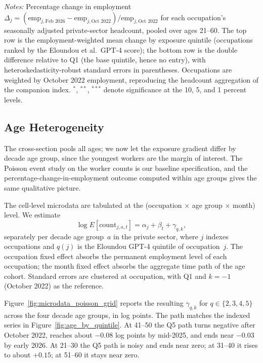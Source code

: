 \documentclass[12pt]{article}
\begin{document}
\begin{table}[tp]
  \centering
  \caption{Employment change by AI-exposure quintile, October 2022 to February 2026, all ages 21--60, private sector, seasonally adjusted.}
  \label{tab:quintile_yagan}
  
  \begin{minipage}{\textwidth}\footnotesize\textit{Notes:} Percentage change in employment $\Delta_j = (\text{emp}_{j,\text{Feb }2026}-\text{emp}_{j,\text{Oct }2022})/\text{emp}_{j,\text{Oct }2022}$ for each occupation's seasonally adjusted private-sector headcount, pooled over ages 21--60. The top row is the employment-weighted mean change by exposure quintile (occupations ranked by the Eloundou et al.\ GPT-4 score); the bottom row is the double difference relative to Q1 (the base quintile, hence no entry), with heteroskedasticity-robust standard errors in parentheses. Occupations are weighted by October 2022 employment, reproducing the headcount aggregation of the companion index. $^{*}$, $^{**}$, $^{***}$ denote significance at the 10, 5, and 1 percent levels.\end{minipage}
\end{table}

\subsection{Age Heterogeneity}\label{sec:regression:age}

The cross-section pools all ages; we now let the exposure gradient differ by decade age group, since the youngest workers are the margin of interest. The Poisson event study on the worker counts is our baseline specification, and the percentage-change-in-employment outcome computed within age groups gives the same qualitative picture.

The cell-level microdata are tabulated at the (occupation $\times$ age group $\times$ month) level. We estimate
\[
\log E[\text{count}_{j,a,t}] = \alpha_{j} + \beta_{t} + \gamma_{q,k},
\]
separately per decade age group~$a$ in the private sector, where $j$ indexes occupations and $q(j)$ is the Eloundou GPT-4 quintile of occupation~$j$. The occupation fixed effect absorbs the permanent employment level of each occupation; the month fixed effect absorbs the aggregate time path of the age cohort. Standard errors are clustered at occupation, with Q1 and $k=-1$ (October 2022) as the reference.

Figure~\ref{fig:microdata_poisson_grid} reports the resulting $\gamma_{q,k}$ for $q\in\{2,3,4,5\}$ across the four decade age groups, in log points. The path matches the indexed series in Figure~\ref{fig:age_by_quintile}. At 41--50 the Q5 path turns negative after October 2022, reaches about $-0.08$ log points by mid-2025, and ends near $-0.03$ by early 2026. At 21--30 the Q5 path is noisy and ends near zero; at 31--40 it rises to about $+0.15$; at 51--60 it stays near zero.
\end{document}
